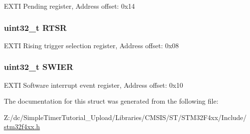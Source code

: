 E\-X\-T\-I Pending register, Address offset\-: 0x14 \hypertarget{struct_e_x_t_i___type_def_a0d952a17455687d6e9053730d028fa1d}{
\subsubsection[{R\-T\-S\-R}]{ uint32\-\_\-t R\-T\-S\-R}}\label{struct_e_x_t_i___type_def_a0d952a17455687d6e9053730d028fa1d}
E\-X\-T\-I Rising trigger selection register, Address offset\-: 0x08 \hypertarget{struct_e_x_t_i___type_def_a9eae93b6cc13d4d25e12f2224e2369c9}{
\subsubsection[{S\-W\-I\-E\-R}]{ uint32\-\_\-t S\-W\-I\-E\-R}}\label{struct_e_x_t_i___type_def_a9eae93b6cc13d4d25e12f2224e2369c9}
E\-X\-T\-I Software interrupt event register, Address offset\-: 0x10 

The documentation for this struct was generated from the following file\-:\begin{DoxyCompactItemize}
\item 
Z\-:/dc/\-Simple\-Timer\-Tutorial\-\_\-\-Upload/\-Libraries/\-C\-M\-S\-I\-S/\-S\-T/\-S\-T\-M32\-F4xx/\-Include/\hyperlink{stm32f4xx_8h}{stm32f4xx.\-h}\end{DoxyCompactItemize}

